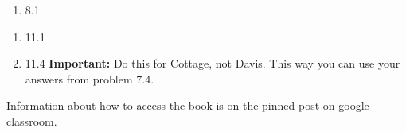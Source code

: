 \documentclass[12pt]{article}
\begin{document}
\begin{enumerate}
\setlength{\itemsep}{-1mm}
  \item 8.1\\ 
\end{enumerate}

\begin{enumerate}
\setlength{\itemsep}{-1mm}
\item 11.1
\item 11.4 {\bf Important:} Do this for Cottage, not Davis. This way
  you can use your answers from problem 7.4.\\ 
\end{enumerate}




\noindent Information about how to access the book is on the
pinned post on google classroom. 
\end{document}
